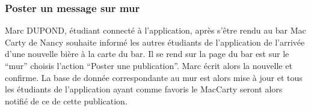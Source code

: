 \subsubsection*{Poster un message sur mur}
Marc DUPOND, étudiant connecté à l'application, après s’être rendu au bar Mac Carty de Nancy souhaite informé les autres étudiants de l'application de l’arrivée d’une nouvelle bière à la carte du bar.
Il se rend sur la page du bar est sur le “mur” choisis l’action “Poster une publication”. Marc écrit alors la nouvelle et confirme. La base de donnée correspondante au mur est alors mise à jour et tous les étudiants de l'application ayant  comme favoris le MacCarty seront alors notifié de ce de cette publication.